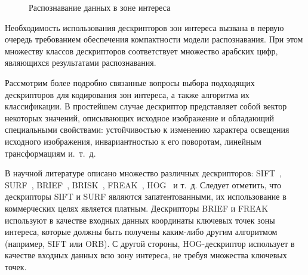 \begin{figure}[h!]
  \centering
  \caption{Распознавание данных в зоне интереса}
  \label{fig:design_algorithm_recognition}
\end{figure}

Необходимость использования дескрипторов зон интереса вызвана в первую
очередь требованием обеспечения компактности модели распознавания.
При этом множеству классов дескрипторов соответствует множество арабских цифр,
являющихся результатами распознавания.

Рассмотрим более подробно связанные вопросы выбора подходящих дескрипторов
для кодирования зон интереса, а также алгоритма их классификации.
В простейшем случае дескриптор представляет собой вектор некоторых значений,
описывающих исходное изображение и обладающий специальными свойствами:
устойчивостью к изменению характера освещения исходного изображения,
инвариантностью к его поворотам, линейным трансформациям и.~т.~д.

В научной литературе описано множество различных дескрипторов:
SIFT~\cite{lowe04},
SURF~\cite{bay08},
BRIEF~\cite{calonder10},
BRISK~\cite{leutenegger11},
FREAK~\cite{ortiz12},
HOG~\cite{dalal05} и т.~д.
Следует отметить, что дескрипторы SIFT и SURF являются запатентованными,
их использование в коммерческих целях является платным.
Дескрипторы BRIEF и FREAK используют в качестве входных данных координаты
ключевых точек зоны интереса, которые должны быть получены каким-либо
другим алгоритмом (например, SIFT или ORB).
С другой стороны, HOG-дескриптор использует в качестве входных
данных всю зону интереса, не требуя множества ключевых точек.

